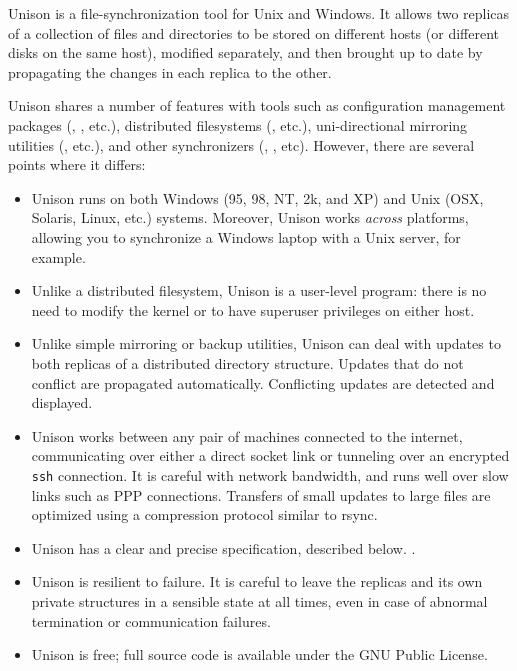 Unison is a file-synchronization tool for Unix and Windows.  It allows
two replicas of a collection of files and directories to be stored on
different hosts (or different disks on the same host), modified
separately, and then brought up to date by propagating the changes in
each replica to the other.

Unison
shares a number of features with tools such as configuration
management packages %
(,
,
etc.),
%
distributed filesystems
(,
etc.),
%
uni-directional mirroring utilities
(,
etc.),
%
and other synchronizers
(,
,
etc).  
%
However, there are several points where it differs:
\begin{itemize}
\item Unison runs on both Windows (95, 98, NT, 2k, and XP) and Unix (OSX, Solaris,
  Linux, etc.) systems.  Moreover, Unison works {\em across}
  platforms, allowing you to synchronize a Windows laptop with a
  Unix server, for example.
\item Unlike a distributed filesystem, Unison is a user-level program:
  there is no need to modify the kernel or to have
  superuser privileges on either host.
\item Unlike simple mirroring or backup utilities, Unison can deal
  with updates to both replicas of a distributed directory structure.
  Updates that do not conflict are propagated automatically.
  Conflicting updates are detected and displayed.
\item Unison works between any pair of machines connected to the
  internet, communicating over either a direct socket link or
  tunneling over an encrypted {\tt ssh} connection.
  It is careful with network bandwidth, and runs well over slow links
  such as PPP connections.  Transfers of small updates to large files are
  optimized using a compression protocol similar to rsync.
\item Unison has a clear and precise specification\iffull, described
below. \else. \fi
  \item Unison is resilient to failure.  It is careful to leave the
  replicas and its own private structures in a sensible state at all
  times, even in case of abnormal termination or communication
  failures.
\item Unison is free; full source code is available under the GNU
Public License.
\end{itemize}
